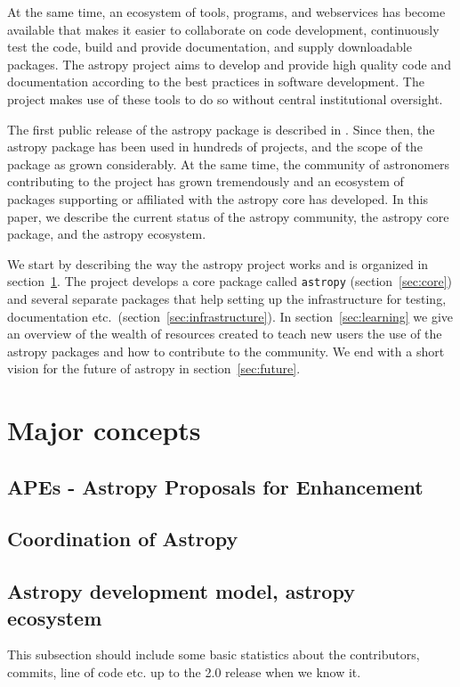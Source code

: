 \documentclass[modern]{aastex61}
\begin{document}
At the same time, an ecosystem of tools, programs, and webservices
has become available that makes it easier to collaborate on code development,
continuously test the code, build and provide documentation, and
supply downloadable packages. The astropy project aims to develop and
provide high quality code and documentation according to the best
practices in software development. The project makes use of these
tools to do so without central institutional oversight.

The first public release of the astropy package is described in
\cite{2013A&A...558A..33A}. Since then, the astropy package has been
used in hundreds of projects, and the scope of the package as grown
considerably. At the same time, the community of astronomers
contributing to the project has grown tremendously and an ecosystem
of packages supporting or affiliated with the astropy core has
developed. In this paper, we describe the current status of the
astropy community, the astropy core package, and the astropy
ecosystem.

We start by describing the way the astropy project works and is
organized in section~\ref{sec:concepts}.  The project develops a core
package called \texttt{astropy} (section~\ref{sec:core}) and several
separate packages that help setting up the infrastructure for testing,
documentation etc.\ (section~\ref{sec:infrastructure}). In
section~\ref{sec:learning} we give an overview of the wealth of
resources created to teach new users the use of the astropy packages
and how to contribute to the community. We end with a short vision for
the future of astropy in section~\ref{sec:future}.



\section{Major concepts}
\label{sec:concepts}
\subsection{APEs - Astropy Proposals for Enhancement}

\subsection{Coordination of Astropy}

\subsection{Astropy development model, astropy ecosystem}
This subsection should include some basic statistics about the contributors, commits, line of code etc. up to the 2.0 release when we know it.
\end{document}
